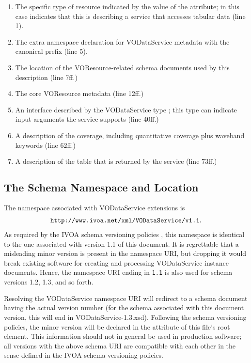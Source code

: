 \documentclass[11pt,a4paper]{ivoa}
\begin{document}
\begin{enumerate}
\item The specific type of resource indicated by
       the value of the  attribute; in this case
        indicates that this is
       describing a service that accesses tabular data (line 1).
\item The extra namespace declaration for
       VODataService metadata with the canonical prefix (line 5).
\item The location of the VOResource-related schema
       documents used by this description (line 7ff.)
\item The core VOResource metadata (line 12ff.)
\item An interface described by the
       VODataService type ; this
       type can indicate input arguments the service supports (line
       40ff.)
\item A description of the
       coverage, including quantitative coverage
       plus waveband keywords (line 62ff.)
\item A description of the table that is returned
       by the service (line 73ff.)
\end{enumerate}

\subsection{The Schema Namespace and Location}


The namespace associated with VODataService extensions is
$$\mbox{\texttt{http://www.ivoa.net/xml/VODataService/v1.1}}.$$
As required by the IVOA schema versioning policies
\citep{2018ivoa.spec.0529H}, this namespace is identical to the one
associated with version 1.1 of this document.  It is regrettable that a
misleading minor version is present in the namespace URI, but dropping
it would break existing software for creating and processing
VODataService instance documents.  Hence, the namespace URI ending in
\verb|1.1| is also used for schema versions 1.2, 1.3, and so forth.

Resolving the VODataService namespace URI will redirect to a schema
document having the actual version number (for the schema associated
with this document version, this will end in VODataService-1.3.xsd).
Following the schema versioning policies, the minor version will be
declared in the  attribute of this file's root element.
This information should not in general be used in production software;
all versions with the above schema URI are compatible with each
other in the sense defined in the IVOA schema versioning policies.
\end{document}
